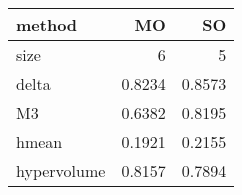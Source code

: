 \begin{tabular}{l r r}
  method &      MO &      SO\\\hline
    size &  6      &  5     \\
   delta &  0.8234 &  0.8573\\
      M3 &  0.6382 &  0.8195\\
   hmean &  0.1921 &  0.2155\\
hypervolume &  0.8157 &  0.7894\\
\end{tabular}
